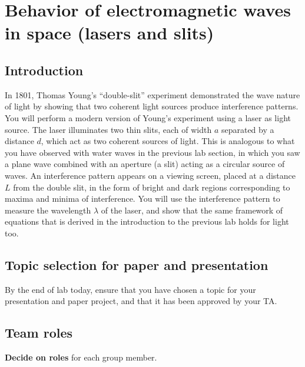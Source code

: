 \chapter{Behavior of electromagnetic waves in space (lasers and slits)}


\section{Introduction}

In 1801, Thomas Young's ``double-slit'' experiment demonstrated the wave nature of light by showing that two coherent light sources produce interference patterns. You will perform a modern version of Young's experiment using a
laser as light source. The laser illuminates two thin slits, each of width $a$ separated by a distance $d$, which act as two
coherent sources of light. This is analogous to what you have observed with water waves in the previous lab section, in
which you saw a plane wave combined with an aperture (a slit) acting as a circular source of waves. An interference
pattern appears on a viewing screen, placed at a distance $L$ from the double slit, in the form of bright and dark regions
corresponding to maxima and minima of interference. You will use the interference pattern to measure the wavelength
$\lambda$ of the laser, and show that the same framework of equations that is derived in the introduction to the previous lab
holds for light too.

\section{Topic selection for paper and presentation}

By the end of lab today, ensure that you have chosen a topic for your presentation and paper project, and that it has been approved by your TA.

\section{Team roles}

\begin{steps}
	\item \textbf{Decide on roles} for each group member.
\end{steps}

